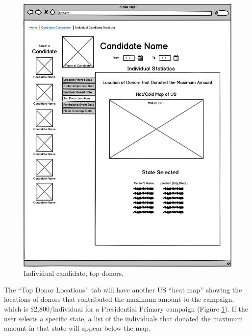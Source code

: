\documentclass[12pt]{article}
\begin{document}
    \begin{figure}[H]
        \begin{center}
        \includegraphics[scale=.30]{candidatetopdonor}
        \caption{Individual candidate, top donors.}
        \label{fig:10}
        \end{center}
    \end{figure}
    The ``Top Donor Locations’’ tab will have another US ``heat map’’ showing the locations of donors that contributed the maximum amount to the campaign, which is \$2,800/individual for a Presidential Primary campaign (Figure \ref{fig:10}). If the user selects a specific state, a list of the individuals that donated the maximum amount in that state will appear below the map.
\end{document}
